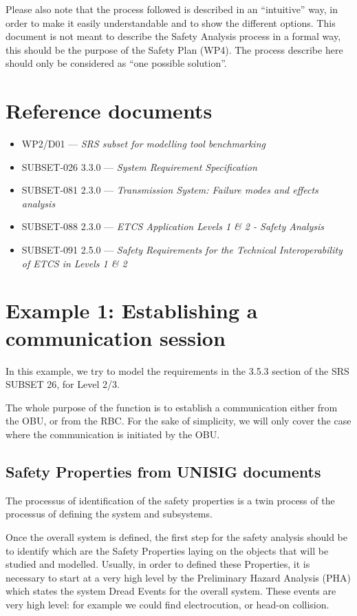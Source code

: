 \documentclass{template/openetcs_article}
\begin{document}
Please also note that the process followed is described in an ``intuitive'' way, in order to make
it easily understandable and to show the different options. This document is not meant to describe 
the Safety Analysis process in a formal way, this should be the purpose of the Safety Plan (WP4). The 
process describe here should only be considered as ``one possible solution''.

\section{Reference documents}
\begin{itemize}
\item WP2/D01 --- \emph{SRS subset for modelling tool benchmarking}
\item SUBSET-026 3.3.0 --- \emph{System Requirement Specification}
\item SUBSET-081 2.3.0 --- \emph{Transmission System: Failure modes and effects analysis}
\item SUBSET-088 2.3.0 --- \emph{ETCS Application Levels 1 \& 2 - Safety Analysis}
\item SUBSET-091 2.5.0 --- \emph{Safety Requirements for the Technical Interoperability
of ETCS in Levels 1 \& 2}
\end{itemize}

\section{Example 1: Establishing a communication session}
In this example, we try to model the requirements in the 3.5.3 section of the SRS SUBSET 26,
for Level 2/3.

The whole purpose of the function is to establish a communication either from the OBU, or from the
RBC. For the sake of simplicity, we will only cover the case where the communication is initiated by 
the OBU.

\subsection{Safety Properties from UNISIG documents}
\label{safety_top}
The processus of identification of the safety properties is a twin process of the processus of 
defining the system and subsystems. 

Once the overall system is defined, the first step for the safety analysis should be to identify 
which are the Safety Properties laying 
on the objects that will be studied and modelled. Usually, in order to defined these Properties,
it is necessary to start at a very high level by the Preliminary Hazard Analysis (PHA) which states the 
system Dread Events for the overall system. These events are very high level: for example we could
find electrocution, or head-on collision.
\end{document}
